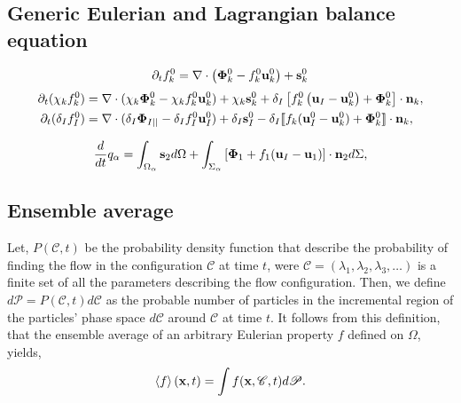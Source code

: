 \documentclass[12pt]{My_preprint}
\begin{document}
\subsection{Generic Eulerian and Lagrangian balance equation}
\begin{equation}
    \label{eq:dt_f_k}
    \pddt f_k^0
    = \div \left(
        \mathbf{\Phi}_k^0
        - f_k^0\textbf{u}_k^0
        \right)
    + \textbf{s}_k^0
\end{equation}
\begin{align}
    \pddt (\chi_k f_k^0)
    &= \div (\chi_k \mathbf{\Phi}_k^0 - \chi_k f_k^0 \textbf{u}_k^0)
    + \chi_k \textbf{s}_k^0
    + \delta_I\left[
        f_k^0
        \left(
            \textbf{u}_I
            - \textbf{u}_k^0
        \right)
        + \mathbf{\Phi}_k^0
    \right]
    \cdot \textbf{n}_k ,
    \label{eq:dt_chi_k_f_k}\\
    \pddt (\delta_If_I^0)  
    &= 
    \div (\delta_I \mathbf{\Phi}_{I||} - \delta_I f_I^0 \textbf{u}_I^0)
    +\delta_I\textbf{s}_I^0 
    - \delta_I \Jump{
    f_k (\textbf{u}_I^0 - \textbf{u}_k^0)
    + \mathbf{\Phi}_k^0
    },
    \label{eq:dt_delta_I_f_I}
\end{align}

\begin{equation}
   \ddt q_\alpha
    = \int_{\Omega_\alpha} \textbf{s}_2 d\Omega
    + \int_{\Sigma_\alpha} \left[\mathbf{\Phi}_1 + f_1 (\textbf{u}_I-\textbf{u}_1) \right] \cdot \textbf{n}_2 d\Sigma,
    \label{eq:dt_dq_alpha_tot}
\end{equation}
\subsection{Ensemble average}

Let, $P(\mathscr{C},t)$ be the probability density function that describe the probability of finding the flow in the configuration $\mathscr{C}$ at time $t$, were $\mathscr{C} = (\lambda_1,\lambda_2,\lambda_3,\ldots)$ is a finite set of all the parameters describing the flow configuration. 
Then, we define $d\mathscr{P} = P(\mathscr{C},t)d\mathscr{C}$ as the probable number of particles in the incremental region of the particles' phase space $d\mathscr{C}$ around $\mathscr{C}$ at time $t$. 
It follows from this definition, that the ensemble average of an arbitrary Eulerian property $f$ defined on $\Omega$, yields,
\begin{equation}
    \avg{f}(\textbf{x},t)
    =\int f(\textbf{x},\mathscr{C},t) d\mathscr{P}. 
    \label{eq:avg}
\end{equation}  
\end{document}
